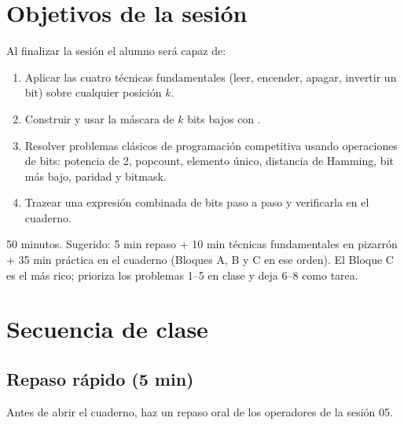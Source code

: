 \documentclass[12pt, oneside]{article}
\begin{document}

\tableofcontents
\newpage

\section{Objetivos de la sesión}

Al finalizar la sesión el alumno será capaz de:

\begin{enumerate}
  \item Aplicar las cuatro técnicas fundamentales (leer, encender, apagar,
        invertir un bit) sobre cualquier posición $k$.
  \item Construir y usar la máscara de $k$ bits bajos con .
  \item Resolver problemas clásicos de programación competitiva usando
        operaciones de bits: potencia de 2, popcount, elemento único,
        distancia de Hamming, bit más bajo, paridad y bitmask.
  \item Trazear una expresión combinada de bits paso a paso y verificarla
        en el cuaderno.
\end{enumerate}

\begin{notaprofesor}
  50 minutos. Sugerido: 5 min repaso + 10 min técnicas fundamentales en pizarrón
  + 35 min práctica en el cuaderno (Bloques A, B y C en ese orden).
  El Bloque C es el más rico; prioriza los problemas 1–5 en clase y deja
  6–8 como tarea.
\end{notaprofesor}

\section{Secuencia de clase}

\subsection{Repaso rápido (5 min)}

Antes de abrir el cuaderno, haz un repaso oral de los operadores de la sesión 05.
\end{document}
